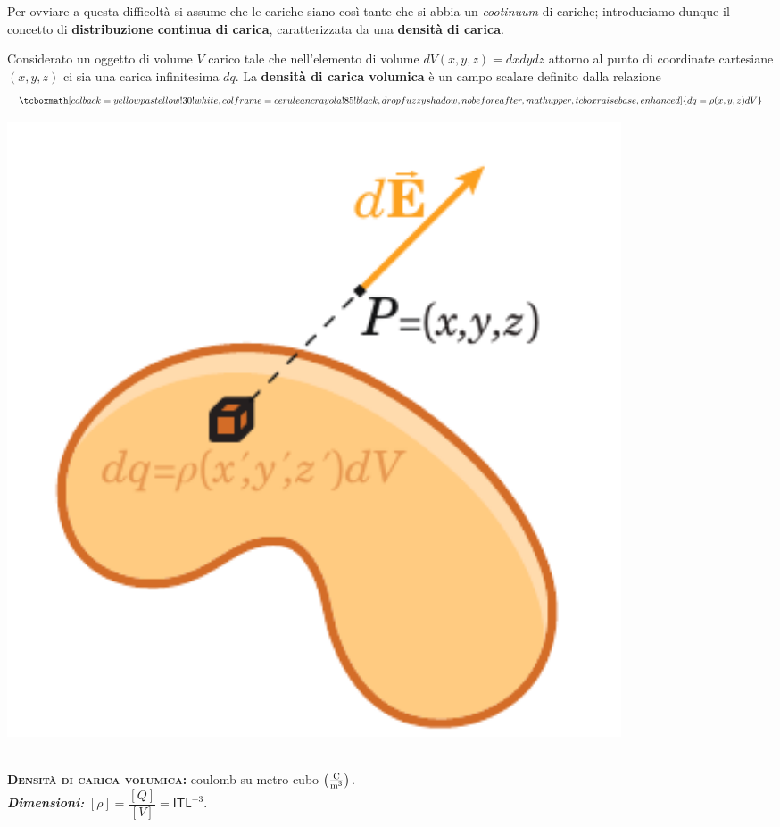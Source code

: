 Per ovviare a questa difficoltà si assume che le cariche siano così tante che si abbia un \textit{cootinuum} di cariche; introduciamo dunque il concetto di \textbf{distribuzione continua di carica}, caratterizzata da una \textbf{densità di carica}.
\begin{define}
\begin{minipage}{0.65\textwidth}
Considerato un oggetto di volume $V$ carico tale che nell'elemento di volume $dV(x,y,z)=dxdydz$ attorno al punto di coordinate cartesiane $(x,y,z)$ ci sia una carica infinitesima $dq$. La \textbf{densità di carica volumica} è un campo scalare definito dalla relazione
	\begin{equation}
		\tcboxmath[colback=yellowpastellow!30!white,colframe=ceruleancrayola!85!black,drop fuzzy shadow, nobeforeafter, math upper, tcbox raise base, enhanced]{dq=\rho(x,y,z)dV}
	\end{equation}
\end{minipage}\hspace{10pt}
\begin{minipage}{0.34\textwidth}
	\begin{center}
		\includegraphics[width=0.8\textwidth]{images/chp1/chp1density.pdf}
	\end{center}
\end{minipage}
\end{define}
\begin{units}~\\
	\textbf{\textsc{Densità di carica volumica:}} coulomb su metro cubo $\left(\unit[per-mode = fraction]{\coulomb\per\cubic\meter}\right)$.\\
	\textit{\textbf{Dimensioni:}} $[\rho]=\dfrac{[Q]}{[V]}=\mathsf{I}\mathsf{T}\mathsf{L}^{-3}$.
\end{units}
